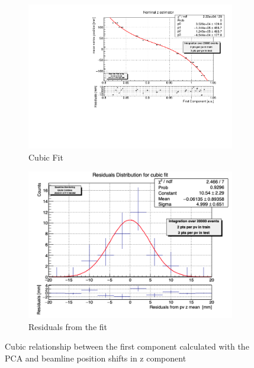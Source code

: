 \begin{figure}
    \centering
    \begin{subfigure}{0.48\textwidth}
    \includegraphics[width=\linewidth]{figures/z_cubic_fit.pdf}
    \caption{Cubic Fit}\label{fig:zfit_cubic_MC}
    \end{subfigure}
    \begin{subfigure}{0.48\textwidth}
    \includegraphics[width=\linewidth]{figures/z_cubic_res.png}
    \caption{Residuals from the fit}\label{fig:zres_cubic_MC}
    \end{subfigure}
    \caption{Cubic relationship between the first component calculated with the PCA and beamline position shifts in z component}
    \label{fig:z_cubic_MC}
\end{figure}



